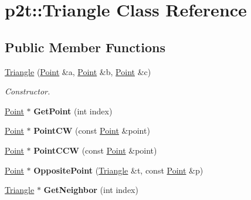 \hypertarget{classp2t_1_1Triangle}{}\section{p2t\+:\+:Triangle Class Reference}
\label{classp2t_1_1Triangle}
\subsection*{Public Member Functions}
\begin{DoxyCompactItemize}
\item 
\mbox{\label{classp2t_1_1Triangle_a9f057674cc3e7c0ed28c8e1237f55bea}} 
\hyperlink{classp2t_1_1Triangle_a9f057674cc3e7c0ed28c8e1237f55bea}{Triangle} (\hyperlink{structp2t_1_1Point}{Point} \&a, \hyperlink{structp2t_1_1Point}{Point} \&b, \hyperlink{structp2t_1_1Point}{Point} \&c)
\begin{DoxyCompactList}\small\item\em Constructor. \end{DoxyCompactList}\item 
\mbox{\label{classp2t_1_1Triangle_a8ab28d082660c314f33b2866bccfd5b1}} 
\hyperlink{structp2t_1_1Point}{Point} $\ast$ {\bfseries Get\+Point} (int index)
\item 
\mbox{\label{classp2t_1_1Triangle_ac12a7eed4efdcd21de31fbc8f0b4d79c}} 
\hyperlink{structp2t_1_1Point}{Point} $\ast$ {\bfseries Point\+CW} (const \hyperlink{structp2t_1_1Point}{Point} \&point)
\item 
\mbox{\label{classp2t_1_1Triangle_ac446d984d5235401c69d5cfbeb7f71a7}} 
\hyperlink{structp2t_1_1Point}{Point} $\ast$ {\bfseries Point\+C\+CW} (const \hyperlink{structp2t_1_1Point}{Point} \&point)
\item 
\mbox{\label{classp2t_1_1Triangle_ab5b7bc4e4d83ce6a2c4a9e4c7344352b}} 
\hyperlink{structp2t_1_1Point}{Point} $\ast$ {\bfseries Opposite\+Point} (\hyperlink{classp2t_1_1Triangle}{Triangle} \&t, const \hyperlink{structp2t_1_1Point}{Point} \&p)
\item 
\mbox{\label{classp2t_1_1Triangle_ac7492adcf5e15ff730d8febcdf668b54}} 
\hyperlink{classp2t_1_1Triangle}{Triangle} $\ast$ {\bfseries Get\+Neighbor} (int index)

\end{DoxyCompactItemize}
